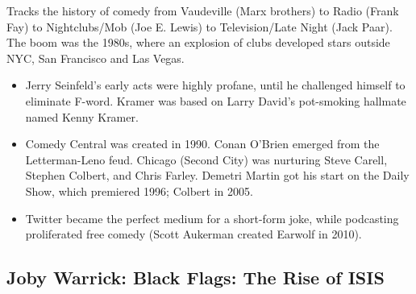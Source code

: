\documentclass[
]{article}
\begin{document}
Tracks the history of comedy from Vaudeville (Marx brothers) to Radio
(Frank Fay) to Nightclubs/Mob (Joe E. Lewis) to Television/Late Night
(Jack Paar). The boom was the 1980s, where an explosion of clubs
developed stars outside NYC, San Francisco and Las Vegas.

\begin{itemize}
\item
  Jerry Seinfeld's early acts were highly profane, until he challenged
  himself to eliminate F-word. Kramer was based on Larry David's
  pot-smoking hallmate named Kenny Kramer.
\item
  Comedy Central was created in 1990. Conan O'Brien emerged from the
  Letterman-Leno feud. Chicago (Second City) was nurturing Steve Carell,
  Stephen Colbert, and Chris Farley. Demetri Martin got his start on the
  Daily Show, which premiered 1996; Colbert in 2005.
\item
  Twitter became the perfect medium for a short-form joke, while
  podcasting proliferated free comedy (Scott Aukerman created Earwolf in
  2010).
\end{itemize}

\hypertarget{joby-warrick-black-flags-the-rise-of-isis}{%
\subsection{Joby Warrick: Black Flags: The Rise of
ISIS}\label{joby-warrick-black-flags-the-rise-of-isis}}
\end{document}
